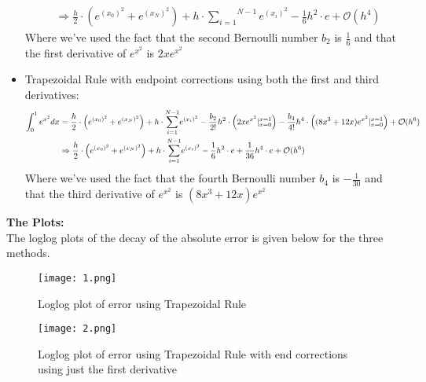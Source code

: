 \documentclass[letterpaper]{exam}
\begin{document}
\begin{questions}
\begin{solution}
\begin{itemize}
\begin{align*}
        &\Rightarrow
        \frac{h}{2}\cdot\left(e^{(x_0)^2}+e^{(x_N)^2}\right) + h\cdot\overset{N-1}{\underset{i=1}{\sum}} e^{(x_i)^2} -\frac{1}{6}h^2\cdot e + \mathcal{O}(h^4)
    \end{align*}
    Where we've used the fact that the second Bernoulli number $b_2$ is $\frac{1}{6}$ and that the first derivative of $e^{x^2}$ is $2xe^{x^2}$ 
    \item Trapezoidal Rule with endpoint corrections using both the first and third derivatives:\\
    \begin{align*}
        \int_{0}^{1} e^{x^2} dx &= \frac{h}{2}\cdot\left(e^{(x_0)^2}+e^{(x_N)^2}\right) + h\cdot\overset{N-1}{\underset{i=1}{\sum}} e^{(x_i)^2} -\frac{b_2}{2!}h^2\cdot\left(2xe^{x^2}\Huge{|}_{x=0}^{x=1}\right) 
        -\frac{b_4}{4!}h^4\cdot\left((8x^3+12x)e^{x^2}\Huge{|}_{x=0}^{x=1}\right)
        +\mathcal{O}(h^6)\\
        &\Rightarrow
        \frac{h}{2}\cdot\left(e^{(x_0)^2}+e^{(x_N)^2}\right) + h\cdot\overset{N-1}{\underset{i=1}{\sum}} e^{(x_i)^2} -\frac{1}{6}h^2\cdot e + \frac{1}{36}h^4\cdot e + \mathcal{O}(h^6)
    \end{align*}
     Where we've used the fact that the fourth Bernoulli number $b_4$ is $-\frac{1}{30}$ and that the third derivative of $e^{x^2}$ is $(8x^3+12x)e^{x^2}$ 
\end{itemize}
\newpage
\textbf{The Plots:}\\
The loglog plots of the decay of the absolute error is given below for the three methods.
\begin{figure}[H]  
     \centering
    \texttt{[image: 1.png]}
     \label{fig:Dendrogram for the problem 3(c)}
     \caption{Loglog plot of error using Trapezoidal Rule}
\end{figure}
\begin{figure}[H]  
     \centering
    \texttt{[image: 2.png]}
     \label{fig:Dendrogram for the problem 3(c)}
     \caption{Loglog plot of error using Trapezoidal Rule with end corrections using just the first derivative}
\end{figure}
\begin{figure}[H]  

\end{figure}
\end{solution}
\end{questions}
\end{document}
